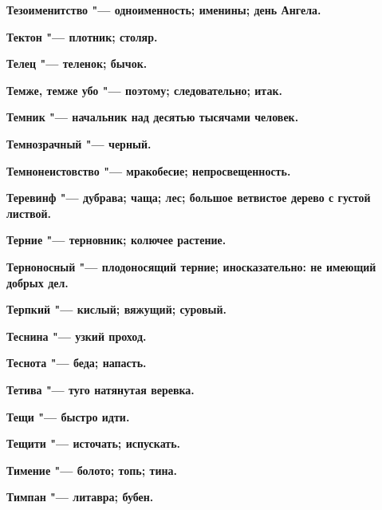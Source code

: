 \begin{mymulticols}{2}
\bfseries Тезоименитство\normalfont{} "--- одноименность; именины; день Ангела. 




\bfseries Тектон\normalfont{} "--- плотник; столяр. 




\bfseries Телец\normalfont{} "--- теленок; бычок. 




\bfseries Темже, темже убо\normalfont{} "--- поэтому; следовательно; итак. 




\bfseries Темник\normalfont{} "--- начальник над десятью тысячами человек. 




\bfseries Темнозрачный\normalfont{} "--- черный. 




\bfseries Темнонеистовство\normalfont{} "--- мракобесие; непросвещенность. 




\bfseries Теревинф\normalfont{} "--- дубрава; чаща; лес; большое ветвистое дерево с густой листвой. 




\bfseries Терние\normalfont{} "--- терновник; колючее растение. 




\bfseries Терноносный\normalfont{} "--- плодоносящий терние; иносказательно: не имеющий добрых дел. 




\bfseries Терпкий\normalfont{} "--- кислый; вяжущий; суровый. 




\bfseries Теснина\normalfont{} "--- узкий проход. 




\bfseries Теснота\normalfont{} "--- беда; напасть. 




\bfseries Тетива\normalfont{} "--- туго натянутая веревка. 




\bfseries Тещи\normalfont{} "--- быстро идти. 




\bfseries Тещити\normalfont{} "--- источать; испускать. 




\bfseries Тимение\normalfont{} "--- болото; топь; тина. 




\bfseries Тимпан\normalfont{} "--- литавра; бубен. 





\end{mymulticols}
